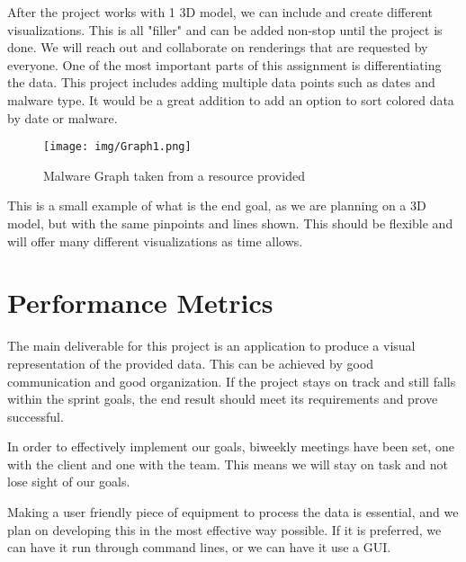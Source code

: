 \documentclass[letterpaper, 10pt] {article}
\begin{document}
After the project works with 1 3D model, we can include and create different visualizations. This is all "filler" and can be added non-stop until the project is done. We will reach out and collaborate on renderings that are requested by everyone. One of the most important parts of this assignment is differentiating the data. This project includes adding multiple data points such as dates and malware type. It would be a great addition to add an option to sort colored data by date or malware.
	\begin{figure}[H]
	\texttt{[image: img/Graph1.png]}
	\caption{Malware Graph taken from a resource provided}
	\label{fig:ibm}
	\end{figure}
This is a small example of what is the end goal, as we are planning on a 3D model, but with the same pinpoints and lines shown. This should be flexible and will offer many different visualizations as time allows.
\section{Performance Metrics}
The main deliverable for this project is an application to produce a visual representation of the provided data. This can be achieved by good communication and good organization. If the project stays on track and still falls within the sprint goals, the end result should meet its requirements and prove successful. 

In order to effectively implement our goals, biweekly meetings have been set, one with the client and one with the team. This means we will stay on task and not lose sight of our goals.

Making a user friendly piece of equipment to process the data is essential, and we plan on developing this in the most effective way possible. If it is preferred, we can have it run through command lines, or we can have it use a GUI.   
\end{document}
